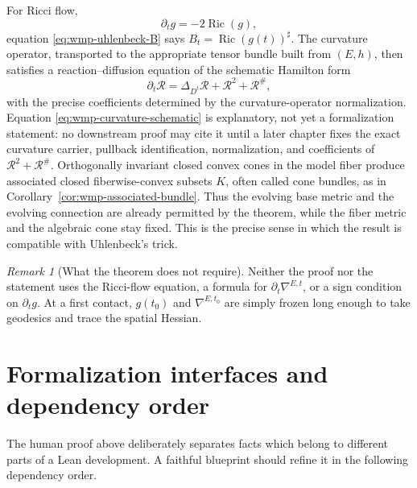 \documentclass[10pt]{coll-l}
\theoremstyle{definition}
\theoremstyle{remark}
\newtheorem{remark}[theorem]{Remark}
\numberwithin{section}{chapter}
\numberwithin{equation}{chapter}
\newcommand{\Ric}{\operatorname{Ric}}
\begin{document}
For Ricci flow,
\[
       \partial_tg=-2\Ric(g),
\]
equation \eqref{eq:wmp-uhlenbeck-B} says $B_t=\Ric(g(t))^\sharp$.
The curvature operator, transported to the appropriate tensor bundle built
from $(E,h)$, then satisfies a reaction--diffusion equation of the schematic
Hamilton form
\begin{equation}
       \partial_t\mathcal R
          =\Delta_{D^t}\mathcal R
             +\mathcal R^2+\mathcal R^\# ,                \label{eq:wmp-curvature-schematic}
\end{equation}
with the precise coefficients determined by the curvature-operator
normalization.  Equation \eqref{eq:wmp-curvature-schematic} is explanatory,
not yet a formalization statement: no downstream proof may cite it until a
later chapter fixes the exact curvature carrier, pullback identification,
normalization, and coefficients of $\mathcal R^2+\mathcal R^\#$.
Orthogonally invariant closed convex cones in the model fiber produce
associated closed fiberwise-convex subsets $K$, often called cone bundles,
as in
Corollary~\ref{cor:wmp-associated-bundle}.  Thus the evolving base metric
and the evolving connection are already permitted by the theorem, while the
fiber metric and the algebraic cone stay fixed.  This is the precise sense
in which the result is compatible with Uhlenbeck's trick.

\begin{remark}[What the theorem does not require]
\label{rem:wmp-no-ricci-hypothesis}
Neither the proof nor the statement uses the Ricci-flow equation, a formula
for $\partial_t\nabla^{E,t}$, or a sign condition on
$\partial_tg$.  At a first contact, $g(t_0)$ and $\nabla^{E,t_0}$ are simply
frozen long enough to take geodesics and trace the spatial Hessian.
\end{remark}

\section{Formalization interfaces and dependency order}
\label{sec:wmp-formalization}

The human proof above deliberately separates facts which belong to different
parts of a Lean development.  A faithful blueprint should refine it in the
following dependency order.
\end{document}
